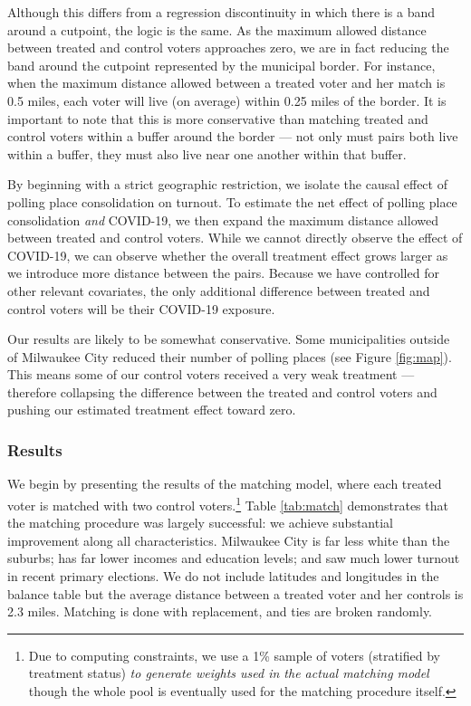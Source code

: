 \documentclass[
  12pt,
]{article}
\begin{document}
Although this differs from a regression discontinuity in which there is a band around a cutpoint, the logic is the same. As the maximum allowed distance between treated and control voters approaches zero, we are in fact reducing the band around the cutpoint represented by the municipal border. For instance, when the maximum distance allowed between a treated voter and her match is 0.5 miles, each voter will live (on average) within 0.25 miles of the border. It is important to note that this is more conservative than matching treated and control voters within a buffer around the border --- not only must pairs both live within a buffer, they must also live near one another within that buffer.

By beginning with a strict geographic restriction, we isolate the causal effect of polling place consolidation on turnout. To estimate the net effect of polling place consolidation \emph{and} COVID-19, we then expand the maximum distance allowed between treated and control voters. While we cannot directly observe the effect of COVID-19, we can observe whether the overall treatment effect grows larger as we introduce more distance between the pairs. Because we have controlled for other relevant covariates, the only additional difference between treated and control voters will be their COVID-19 exposure.

Our results are likely to be somewhat conservative. Some municipalities outside of Milwaukee City reduced their number of polling places (see Figure \ref{fig:map}). This means some of our control voters received a very weak treatment --- therefore collapsing the difference between the treated and control voters and pushing our estimated treatment effect toward zero.

\hypertarget{results}{%
\subsubsection*{Results}\label{results}}

We begin by presenting the results of the matching model, where each treated voter is matched with two control voters.\footnote{Due to computing constraints, we use a 1\% sample of voters (stratified by treatment status) \emph{to generate weights used in the actual matching model} though the whole pool is eventually used for the matching procedure itself.} Table \ref{tab:match} demonstrates that the matching procedure was largely successful: we achieve substantial improvement along all characteristics. Milwaukee City is far less white than the suburbs; has far lower incomes and education levels; and saw much lower turnout in recent primary elections. We do not include latitudes and longitudes in the balance table but the average distance between a treated voter and her controls is 2.3 miles. Matching is done with replacement, and ties are broken randomly.
\end{document}
